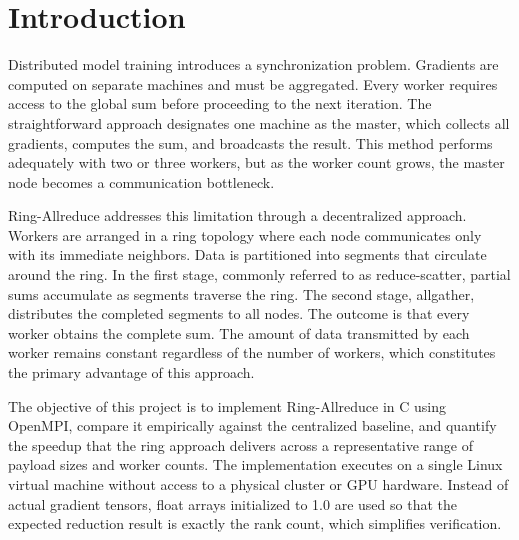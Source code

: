 \documentclass[12pt,a4paper]{article}
\begin{document}
\section{Introduction}

Distributed model training introduces a synchronization problem. Gradients are computed on separate machines and must be aggregated. Every worker requires access to the global sum before proceeding to the next iteration. The straightforward approach designates one machine as the master, which collects all gradients, computes the sum, and broadcasts the result. This method performs adequately with two or three workers, but as the worker count grows, the master node becomes a communication bottleneck.

Ring-Allreduce addresses this limitation through a decentralized approach. Workers are arranged in a ring topology where each node communicates only with its immediate neighbors. Data is partitioned into segments that circulate around the ring. In the first stage, commonly referred to as reduce-scatter, partial sums accumulate as segments traverse the ring. The second stage, allgather, distributes the completed segments to all nodes. The outcome is that every worker obtains the complete sum. The amount of data transmitted by each worker remains constant regardless of the number of workers, which constitutes the primary advantage of this approach.

The objective of this project is to implement Ring-Allreduce in C using OpenMPI, compare it empirically against the centralized baseline, and quantify the speedup that the ring approach delivers across a representative range of payload sizes and worker counts. The implementation executes on a single Linux virtual machine without access to a physical cluster or GPU hardware. Instead of actual gradient tensors, float arrays initialized to 1.0 are used so that the expected reduction result is exactly the rank count, which simplifies verification.
\end{document}
